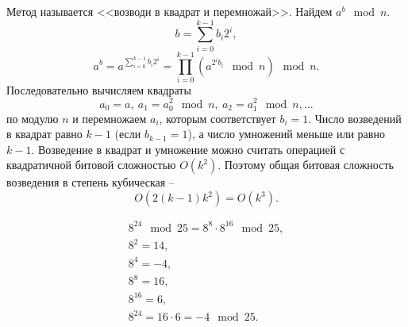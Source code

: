 Метод называется <<возводи в квадрат и перемножай>>. Найдем $a^b \mod n$.
    \[ b = \sum_{i=0}^{k-1} b_i 2^i, \]
    \[ a^b = a^{\sum\limits_{i=0}^{k-1} b_i 2^i} = \prod_{i=0}^{k-1} (a^{{2^i} b_i} \mod n) \mod n. \]
Последовательно вычисляем квадраты
    \[ a_0 = a, ~ a_1 = a_0^2 \mod n, ~ a_2 = a_1^2 \mod n,  \ldots  \]
по модулю $n$ и перемножаем $a_i$, которым соответствует $b_i = 1$.  Число возведений в квадрат равно $k-1$ (если $b_{k-1} =1$), а число умножений меньше или равно $k-1$. Возведение в квадрат и умножение можно считать операцией с квадратичной битовой сложностью $O(k^2)$. Поэтому общая битовая сложность возведения в степень кубическая --
    \[ O(2(k-1)k^2) = O(k^3). \]

\example
\[ \begin{array}{l}
    8^{24} \mod 25 = 8^8 \cdot 8^{16} \mod 25, \\
    8^2 = 14, \\
    8^4 = -4, \\
    8^8 = 16, \\
    8^{16} = 6, \\
    8^{24} = 16 \cdot 6 = -4 \mod 25.
\end{array} \]
\exampleend
